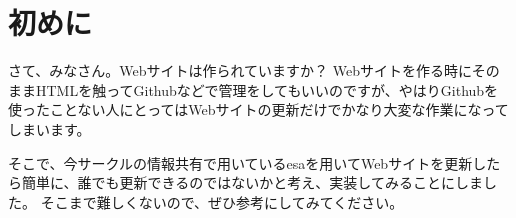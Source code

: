 \chapter{初めに}

さて、みなさん。Webサイトは作られていますか？
Webサイトを作る時にそのままHTMLを触ってGithubなどで管理をしてもいいのですが、やはりGithubを使ったことない人にとってはWebサイトの更新だけでかなり大変な作業になってしまいます。

そこで、今サークルの情報共有で用いているesaを用いてWebサイトを更新したら簡単に、誰でも更新できるのではないかと考え、実装してみることにしました。
そこまで難しくないので、ぜひ参考にしてみてください。